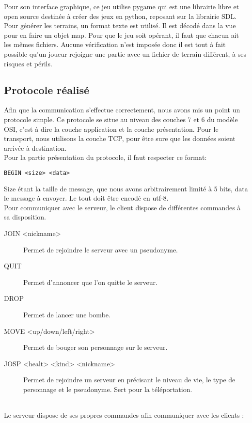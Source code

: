\documentclass[12pt]{article}
\begin{document}
Pour son interface graphique, ce jeu utilise pygame qui est une librairie libre et open source destinée à créer des jeux en python, reposant sur la librairie SDL.
\\

Pour générer les terrains, un format texte est utilisé. Il est décodé dans la vue pour en faire un objet map. Pour que le jeu soit opérant, il faut que chacun ait les mêmes fichiers. Aucune vérification n'est imposée donc il est tout à fait possible qu'un joueur rejoigne une partie avec un fichier de terrain différent, à ses risques et périls.
\subsection{Protocole réalisé}
Afin que la communication s'effectue correctement, nous avons mis un point un protocole simple.
Ce protocole se situe au niveau des couches 7 et 6 du modèle OSI, c'est à dire la couche application et la couche présentation. Pour le transport, nous utilisons la couche TCP, pour être sure que les données soient arrivée à destination.
\\
Pour la partie présentation du protocole, il faut respecter ce format:\\
\begin{lstlisting}
BEGIN <size> <data>
\end{lstlisting}
Size étant la taille de message, que nous avons arbitrairement limité à 5 bits,
data le message à envoyer.
Le tout doit être encodé en utf-8.
\\
Pour communiquer avec le serveur, le client dispose de différentes commandes à sa disposition.\\
\begin{description}
\item[JOIN <nickname>] Permet de rejoindre le serveur avec un pseudonyme.
\item[QUIT] Permet d'annoncer que l'on quitte le serveur.
\item[DROP] Permet de lancer une bombe.
\item[MOVE <up/down/left/right>] Permet de bouger son personnage sur le serveur.
\item[JOSP <healt> <kind> <nickname>] Permet de rejoindre un serveur en précisant le niveau de vie, le type de personnage et le pseudonyme. Sert pour la téléportation.
\end{description}
\\
Le serveur dispose de ses propres commandes afin communiquer avec les clients :\\
\end{document}

